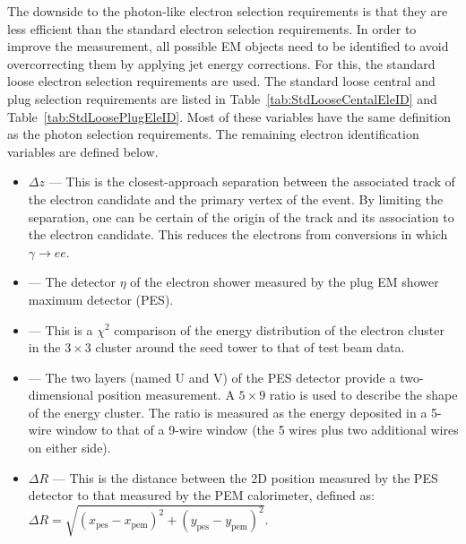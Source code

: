 The downside to the photon-like electron selection requirements is that they are less efficient than the standard electron selection requirements. In order to improve the \met measurement, all possible EM objects need to be identified to avoid overcorrecting them by applying jet energy corrections. For this, the standard loose electron selection requirements are used. The standard loose central and plug selection requirements are listed in Table~\ref{tab:StdLooseCentalEleID} and Table~\ref{tab:StdLoosePlugEleID}. Most of these variables have the same definition as the photon selection requirements. The remaining electron identification variables are defined below.

\vspace{-0.01\textheight}
\begin{singlespace}
\begin{itemize}
\item {$\Delta z$ --- This is the closest-approach separation between the associated track of the electron candidate and the primary vertex of the event. By limiting the separation, one can be certain of the origin of the track and its association to the electron candidate. This reduces the electrons from conversions in which $\gamma\to ee$.}

\item{ --- The detector $\eta$ of the electron shower measured by the plug EM shower maximum detector (PES).}

\item{ --- This is a $\chi^{2}$ comparison of the energy distribution of the electron cluster in the $3\times3$ cluster around the seed tower to that of test beam data.}

\item{ --- The two layers (named U and V) of the PES detector provide a two-dimensional position measurement. A $5\times9$ ratio is used to describe the shape of the energy cluster. The ratio is measured as the energy deposited in a 5-wire window to that of a 9-wire window (the 5 wires plus two additional wires on either side).}

\item{$\Delta R$ --- This is the distance between the 2D position measured by the PES detector to that measured by the PEM calorimeter, defined as: $\Delta R = \sqrt{(x_\mathrm{pes}-x_\mathrm{pem})^{2}+(y_\mathrm{pes}-y_\mathrm{pem})^{2}}$.}
\end{itemize}
\end{singlespace}


